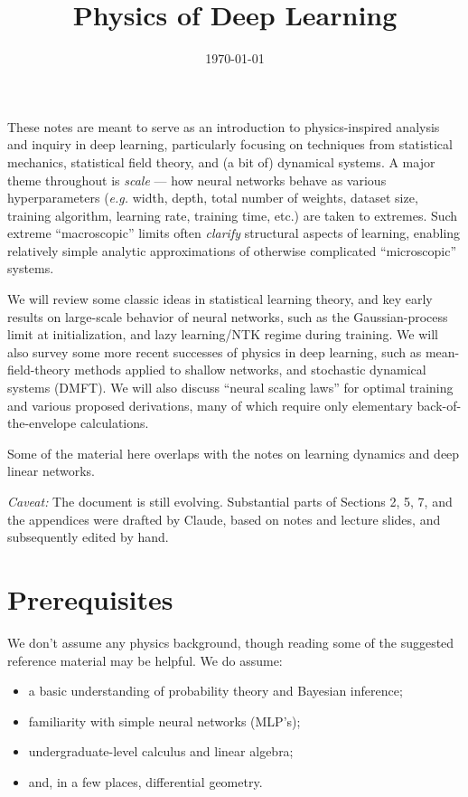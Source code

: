 \documentclass[11pt]{article}
\title{Physics of Deep Learning}
\author{\authorname{Aleksander Czejdo} \hspace{.7in} %
\and \authorname{Tudor Dimofte} %
\and \hspace{.2in}\authorname{Brianna Grado-White}\hspace{.3in}  %
\and \authorname{Charles Renshaw-Whitman} %
}
\date{\today}
\begin{document}
\maketitle

\begin{summary}
These notes are meant to serve as an introduction to physics-inspired analysis and
inquiry in deep learning, particularly focusing on techniques from statistical mechanics,
statistical field theory, and (a bit of) dynamical systems. A major theme throughout is
\emph{scale} --- how neural networks behave as various hyperparameters (\emph{e.g.} width,
depth, total number of weights, dataset size, training algorithm, learning rate, training time, etc.)
are taken to extremes. Such extreme ``macroscopic'' limits often \emph{clarify} structural aspects
of learning, enabling relatively simple analytic approximations of otherwise complicated ``microscopic'' systems.

We will review some classic ideas in statistical learning theory, and key early results
on large-scale behavior of neural networks, such as the Gaussian-process limit at initialization,
and lazy learning/NTK regime during training. We will also survey some more recent successes of
physics in deep learning, such as mean-field-theory methods applied to shallow networks,
and stochastic dynamical systems (DMFT). We will also discuss ``neural scaling laws'' for optimal
training and various proposed derivations, many of which require only elementary
back-of-the-envelope calculations.

Some of the material here overlaps with the notes on learning dynamics and deep linear networks.

\emph{Caveat:} The document is still evolving. Substantial parts of Sections 2, 5, 7, and the appendices
were drafted by Claude, based on notes and lecture slides, and subsequently edited by hand.
\end{summary}

\newpage
{\small\tableofcontents}

\setcounter{section}{-2}
\section{Prerequisites}
\label{sec:prereqs}

We don't assume any physics background, though reading some of the suggested
reference material may be helpful. We do assume:
\begin{itemize}
  \item a basic understanding of probability theory and Bayesian inference;
  \item familiarity with simple neural networks (MLP's);
  \item undergraduate-level calculus and linear algebra;
  \item and, in a few places, differential geometry.
\end{itemize}
\end{document}
